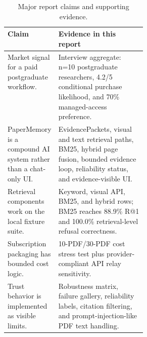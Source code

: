 \begin{table}[t]
  \caption{Major report claims and supporting evidence.}
  \label{tab:claim-evidence-boundary}
  \centering
  \small
  \setlength{\tabcolsep}{3pt}
  \begin{tabularx}{\linewidth}{p{0.32\linewidth}Y}
    \toprule
    Claim & Evidence in this report \\
    \midrule
    Market signal for a paid postgraduate workflow. & Interview aggregate: n=10 postgraduate researchers, 4.2/5 conditional purchase likelihood, and 70\% managed-access preference. \\
    PaperMemory is a compound AI system rather than a chat-only UI. & EvidencePackets, visual and text retrieval paths, BM25, hybrid page fusion, bounded evidence loop, reliability status, and evidence-visible UI. \\
    Retrieval components work on the local fixture suite. & Keyword, visual API, BM25, and hybrid rows; BM25 reaches 88.9\% R@1 and 100.0\% retrieval-level refusal correctness. \\
    Subscription packaging has bounded cost logic. & 10-PDF/30-PDF cost stress test plus provider-compliant API relay sensitivity. \\
    Trust behavior is implemented as visible limits. & Robustness matrix, failure gallery, reliability labels, citation filtering, and prompt-injection-like PDF text handling. \\
    \bottomrule
  \end{tabularx}
\end{table}
